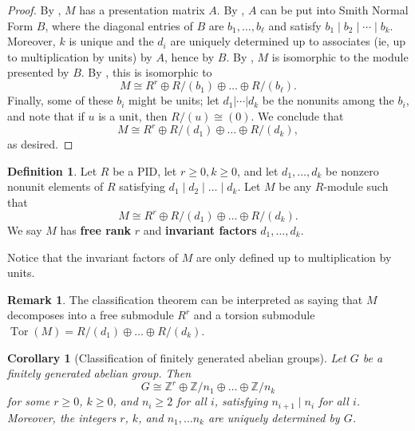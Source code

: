 \documentclass[12pt]{report}
\newtheorem{corollary}[theorem]{Corollary}
\numberwithin{equation}{section}
\numberwithin{theorem}{chapter}
\theoremstyle{definition}
\newtheorem{definition}[theorem]{Definition}
\newtheorem*{basic properties}{Basic Properties}
\newtheorem*{Important Remark}{Important Remark}
\newtheorem{remark}[theorem]{Remark}
\newcommand{\df}[1]{{\bf #1}\index{#1}}
\DeclareMathOperator{\Tor}{Tor}
\begin{document}
\begin{proof}
By , $M$ has a presentation matrix $A$. By , $A$ can be put into Smith Normal Form $B$, where the diagonal entries of $B$ are $b_1, \ldots, b_\ell$ and satisfy $b_1 \mid b_2 \mid \cdots \mid b_k$. Moreover, $k$ is unique and the $d_i$ are uniquely determined up to associates (ie, up to multiplication by units) by $A$, hence by $B$. By , $M$ is isomorphic to the module presented by $B$. 
By , this is isomorphic to 
$$M \cong R^r \oplus R/(b_1) \oplus \dots \oplus R/(b_\ell).$$
Finally, some of these $b_i$ might be units; let $d_1 | \cdots | d_k$ be the nonunits among the $b_i$, and note that if $u$ is a unit, then $R/(u) \cong (0)$. We conclude that
$$M \cong R^r \oplus R/(d_1) \oplus \dots \oplus R/(d_k),$$
as desired.
\end{proof}

\begin{definition} 
Let $R$ be a PID, let $r \geqslant 0, k \geqslant 0$, and let $d_1,\ldots, d_k$ be nonzero nonunit elements of $R$ satisfying $d_1 \mid d_2 \mid \dots \mid d_k$. Let $M$ be any $R$-module such that 
$$M \cong R^r \oplus R/(d_1) \oplus \dots \oplus R/(d_k).$$ 
We say $M$ has \df{free rank} $r$ and \df{invariant factors} $d_1,\ldots,d_k$.
\end{definition}

Notice that the invariant factors of $M$ are only defined up to multiplication by units.

\begin{remark}
The classification theorem can be interpreted as saying that $M$ decomposes into a free submodule $R^r$ and a torsion submodule $\Tor(M)=R/(d_1) \oplus \dots \oplus R/(d_k)$.
\end{remark}



\begin{corollary}[Classification of finitely generated abelian groups]%
Let $G$ be a finitely generated abelian group. Then 
$$G \cong \mathbb{Z}^r \oplus \mathbb{Z}/n_1 \oplus \dots \oplus \mathbb{Z}/n_k$$ 
for some $r \geqslant 0$, $k \geqslant 0$, and $n_i \geqslant 2$ for all $i$, satisfying $n_{i+1} \mid n_i$ for all $i$. Moreover, the integers $r$, $k$, and $n_1,\ldots n_k$ are uniquely determined by $G$.
\end{corollary}
\end{document}
